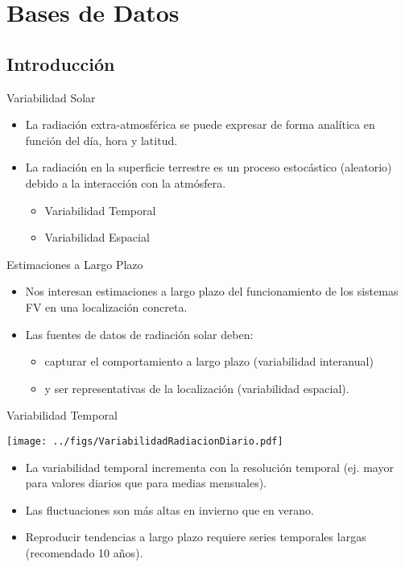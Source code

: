\documentclass[xcolor={usenames,svgnames,dvipsnames}]{beamer}
\begin{document}
\section{Bases de Datos}
\label{sec:org604ed67}
\subsection{Introducción}
\label{sec:orgeed3275}
\begin{frame}[label={sec:orgde887ac}]{Variabilidad Solar}
\begin{itemize}
\item La \alert{radiación extra-atmosférica} se puede expresar de forma \alert{analítica} en función del día, hora y latitud.
\item La \alert{radiación en la superficie terrestre} es un \alert{proceso estocástico} (aleatorio) debido a la interacción con la atmósfera.
\begin{itemize}
\item Variabilidad Temporal
\item Variabilidad Espacial
\end{itemize}
\end{itemize}
\end{frame}
\begin{frame}[label={sec:org3778802}]{Estimaciones a Largo Plazo}
\begin{itemize}
\item Nos interesan \alert{estimaciones a largo plazo} del funcionamiento de los sistemas FV en una localización concreta.
\item Las fuentes de datos de radiación solar deben:
\begin{itemize}
\item \alert{capturar el comportamiento a largo plazo} (variabilidad interanual)
\item y ser \alert{representativas de la localización} (variabilidad espacial).
\end{itemize}
\end{itemize}
\end{frame}

\begin{frame}[label={sec:orgdbeb82b}]{Variabilidad Temporal}
\begin{center}
\texttt{[image: ../figs/VariabilidadRadiacionDiario.pdf]}
\end{center}

\begin{itemize}
\item La variabilidad temporal \alert{incrementa con la resolución temporal} (ej. mayor para valores diarios que para medias mensuales).
\item Las fluctuaciones son \alert{más altas en invierno que en verano}.
\item Reproducir \alert{tendencias a largo plazo} requiere \alert{series temporales largas} (recomendado 10 años).
\end{itemize}
\end{frame}
\end{document}
